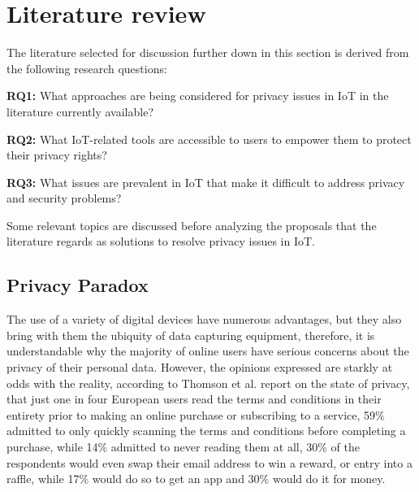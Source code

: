 \documentclass[conference]{IEEEtran}
\begin{document}
\section{Literature review}

The literature selected for discussion further down in this section is derived
from the following research questions:

\textbf{RQ1:} What approaches are being considered for privacy issues in
IoT in the literature currently available?

\textbf{RQ2:} What IoT-related tools are accessible to users to empower
them to protect their privacy rights?

\textbf{RQ3:} What issues are prevalent in IoT that make it difficult to
address privacy and security problems?

Some relevant topics are discussed before analyzing the proposals that the
literature regards as solutions to resolve privacy issues in IoT.

\subsection{Privacy Paradox}

The use of a variety of digital devices have numerous advantages, but they
also bring with them the ubiquity of data capturing equipment, therefore,
it is understandable why the majority of online users have serious concerns
about the privacy of their personal data. However, the opinions expressed
are starkly at odds with the reality, according to Thomson et al. \cite{DarrenState}
report on the state of privacy, that just one in four European users read
the terms and conditions in their entirety prior to making an online purchase
or subscribing to a service, 59\% admitted to only quickly scanning the terms
and conditions before completing a purchase, while 14\% admitted to never
reading them at all, 30\% of the respondents would even swap their email
address to win a reward, or entry into a raffle, while 17\% would do so to
get an app and 30\% would do it for money.
\end{document}
